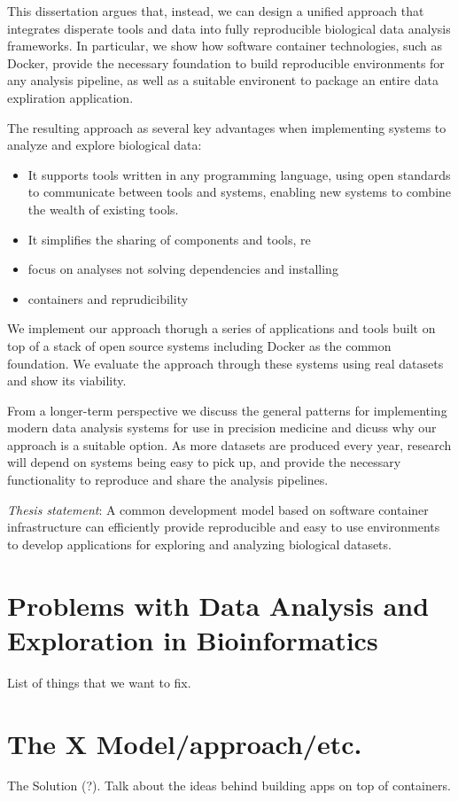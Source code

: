 This dissertation argues that, instead, we can design a unified approach that
integrates disperate tools and data into fully reproducible biological data
analysis frameworks.  In particular, we show how software container
technologies, such as Docker, provide the necessary foundation to build
reproducible environments for any analysis pipeline, as well as a suitable
environent to package an entire data expliration application. 

The resulting approach as several key advantages when implementing systems to
analyze and explore biological data:
\begin{itemize} 
    \item It supports tools written in any programming language, using open
        standards to communicate between tools and systems, enabling new systems
        to combine the wealth of existing tools. 
    \item It simplifies the sharing of components and tools, re
    \item focus on analyses not solving dependencies and installing
    \item containers and reprudicibility
\end{itemize} 

We implement our approach thorugh a series of applications and tools built on
top of a stack of open source systems including Docker as the common foundation.
We evaluate the approach through these systems using real datasets and show its
viability. 

From a longer-term perspective we discuss the general patterns for implementing
modern data analysis systems for use in precision medicine and dicuss why our
approach is a suitable option. As more datasets are produced every year,
research will depend on systems being easy to pick up, and provide the necessary
functionality to reproduce and share the analysis pipelines. 

\emph{Thesis statement}:
A common development model based on software container infrastructure can
efficiently provide reproducible and easy to use environments to develop
applications for exploring and analyzing biological datasets. 

\section{Problems with Data Analysis and Exploration in Bioinformatics} 
    List of things that we want to fix. 

\section{The X Model/approach/etc.} 
    The Solution (?). Talk about the ideas behind building apps on top of
    containers.  

